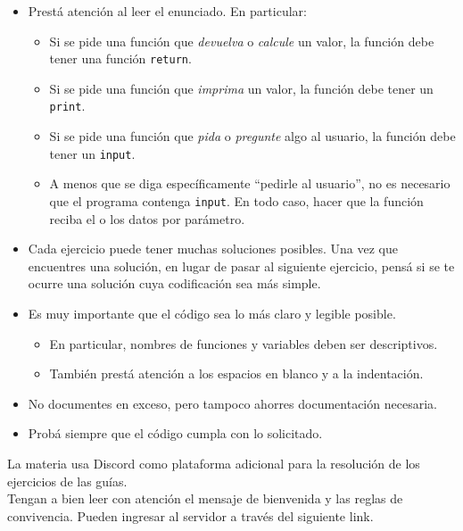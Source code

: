 \documentclass[
  letterpaper,
  DIV=11,
  numbers=noendperiod]{scrreprt}
\providecommand{\tightlist}{%
  \setlength{\itemsep}{0pt}\setlength{\parskip}{0pt}}\usepackage{longtable,booktabs,array}
\begin{document}
\begin{itemize}
\tightlist
\item
  Prestá atención al leer el enunciado. En particular:

  \begin{itemize}
  \tightlist
  \item
    Si se pide una función que \emph{devuelva} o \emph{calcule} un
    valor, la función debe tener una función \texttt{return}.
  \item
    Si se pide una función que \emph{imprima} un valor, la función debe
    tener un \texttt{print}.
  \item
    Si se pide una función que \emph{pida} o \emph{pregunte} algo al
    usuario, la función debe tener un \texttt{input}.
  \item
    A menos que se diga específicamente ``pedirle al usuario'', no es
    necesario que el programa contenga \texttt{input}. En todo caso,
    hacer que la función reciba el o los datos por parámetro.
  \end{itemize}
\item
  Cada ejercicio puede tener muchas soluciones posibles. Una vez que
  encuentres una solución, en lugar de pasar al siguiente ejercicio,
  pensá si se te ocurre una solución cuya codificación sea más simple.
\item
  Es muy importante que el código sea lo más claro y legible posible.

  \begin{itemize}
  \tightlist
  \item
    En particular, nombres de funciones y variables deben ser
    descriptivos.
  \item
    También prestá atención a los espacios en blanco y a la indentación.
  \end{itemize}
\item
  No documentes en exceso, pero tampoco ahorres documentación necesaria.
\item
  Probá siempre que el código cumpla con lo solicitado.
\end{itemize}

\begin{tcolorbox}[enhanced jigsaw, arc=.35mm, toptitle=1mm, colframe=quarto-callout-note-color-frame, bottomtitle=1mm, opacitybacktitle=0.6, colbacktitle=quarto-callout-note-color!10!white, leftrule=.75mm, coltitle=black, toprule=.15mm, titlerule=0mm, title=\textcolor{quarto-callout-note-color}{\faInfo}\hspace{0.5em}{Discord}, bottomrule=.15mm, rightrule=.15mm, colback=white, breakable, opacityback=0, left=2mm]

La materia usa Discord como plataforma adicional para la resolución de
los ejercicios de las guías.\\
Tengan a bien leer con atención el mensaje de bienvenida y las reglas de
convivencia. Pueden ingresar al servidor a través del siguiente link.

\end{tcolorbox}
\end{document}
